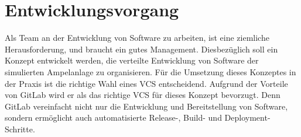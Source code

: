 \section{Entwicklungsvorgang}

Als Team an der Entwicklung von Software zu arbeiten, ist eine ziemliche Herausforderung, und braucht ein gutes Management. Diesbezüglich soll ein Konzept entwickelt werden, die verteilte Entwicklung von Software der simulierten Ampelanlage zu organisieren. 
\newline\newline
Für die Umsetzung dieses Konzeptes in der Praxis ist die richtige Wahl eines VCS entscheidend. Aufgrund der Vorteile von GitLab wird er als das richtige VCS für dieses Konzept bevorzugt. Denn GitLab vereinfacht nicht nur die Entwicklung und Bereitstellung von Software, sondern ermöglicht auch automatisierte Release-, Build- und Deployment-Schritte.
